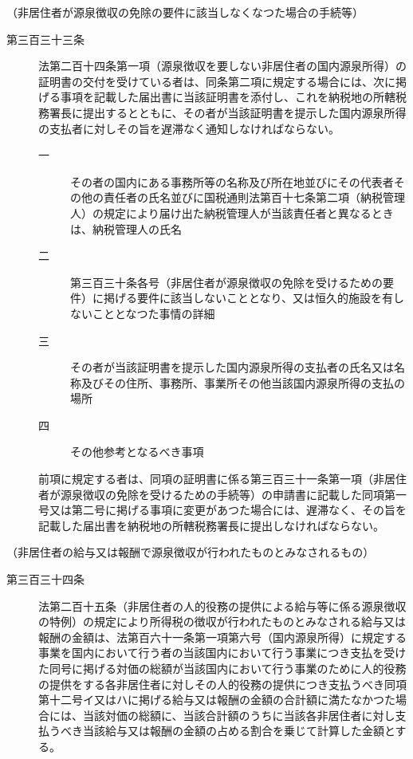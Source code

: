 \documentclass[twocolumn,a4j,10pt]{ltjtarticle}
\begin{document}
\noindent\hspace{10pt}（非居住者が源泉徴収の免除の要件に該当しなくなつた場合の手続等）
\begin{description}
\item[第三百三十三条]法第二百十四条第一項（源泉徴収を要しない非居住者の国内源泉所得）の証明書の交付を受けている者は、同条第二項に規定する場合には、次に掲げる事項を記載した届出書に当該証明書を添付し、これを納税地の所轄税務署長に提出するとともに、その者が当該証明書を提示した国内源泉所得の支払者に対しその旨を遅滞なく通知しなければならない。
\begin{description}
\item[一]その者の国内にある事務所等の名称及び所在地並びにその代表者その他の責任者の氏名並びに国税通則法第百十七条第二項（納税管理人）の規定により届け出た納税管理人が当該責任者と異なるときは、納税管理人の氏名
\item[二]第三百三十条各号（非居住者が源泉徴収の免除を受けるための要件）に掲げる要件に該当しないこととなり、又は恒久的施設を有しないこととなつた事情の詳細
\item[三]その者が当該証明書を提示した国内源泉所得の支払者の氏名又は名称及びその住所、事務所、事業所その他当該国内源泉所得の支払の場所
\item[四]その他参考となるべき事項
\end{description}
\item[]前項に規定する者は、同項の証明書に係る第三百三十一条第一項（非居住者が源泉徴収の免除を受けるための手続等）の申請書に記載した同項第一号又は第二号に掲げる事項に変更があつた場合には、遅滞なく、その旨を記載した届出書を納税地の所轄税務署長に提出しなければならない。
\end{description}
\noindent\hspace{10pt}（非居住者の給与又は報酬で源泉徴収が行われたものとみなされるもの）
\begin{description}
\item[第三百三十四条]法第二百十五条（非居住者の人的役務の提供による給与等に係る源泉徴収の特例）の規定により所得税の徴収が行われたものとみなされる給与又は報酬の金額は、法第百六十一条第一項第六号（国内源泉所得）に規定する事業を国内において行う者の当該国内において行う事業につき支払を受けた同号に掲げる対価の総額が当該国内において行う事業のために人的役務の提供をする各非居住者に対しその人的役務の提供につき支払うべき同項第十二号イ又はハに掲げる給与又は報酬の金額の合計額に満たなかつた場合には、当該対価の総額に、当該合計額のうちに当該各非居住者に対し支払うべき当該給与又は報酬の金額の占める割合を乗じて計算した金額とする。
\end{description}
\end{document}

